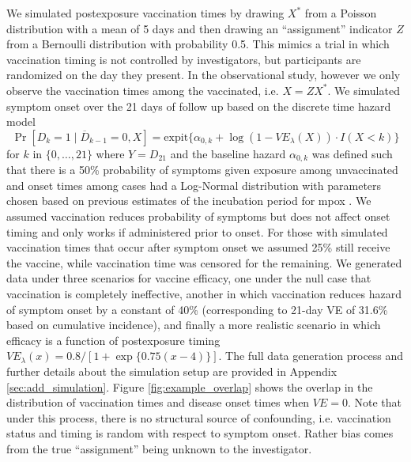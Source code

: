 \documentclass[11pt]{article}
\begin{document}
We simulated postexposure vaccination times by drawing $X^*$ from a Poisson distribution with a mean of 5 days and then drawing an ``assignment'' indicator $Z$ from a Bernoulli distribution with probability 0.5. This mimics a trial in which vaccination timing is not controlled by investigators, but participants are randomized on the day they present. In the observational study, however we only observe the vaccination times among the vaccinated, i.e. $X = ZX^* $. We simulated symptom onset over the 21 days of follow up based on the discrete time hazard model 
$$\Pr[D_k = 1 \mid \overline{D}_{k-1} = 0, X] =  \text{expit}\{\alpha_{0,k} + \log(1 - VE_{\lambda}(X)) \cdot I(X < k)\}$$
for $k$ in $\{0, \ldots, 21\}$ where $Y = D_{21}$ and the baseline hazard $\alpha_{0,k}$ was defined such that there is a 50\% probability of symptoms given exposure among unvaccinated and onset times among cases had a Log-Normal distribution with parameters chosen based on previous estimates of the incubation period for mpox \cite{miura_estimated_2022}. We assumed vaccination reduces probability of symptoms but does not affect onset timing and only works if administered prior to onset. For those with simulated vaccination times that occur after symptom onset we assumed 25\% still receive the vaccine, while vaccination time was censored for the remaining. We generated data under three scenarios for vaccine efficacy, one under the null case that vaccination is completely ineffective, another in which vaccination reduces hazard of symptom onset by a constant of 40\% (corresponding to 21-day VE of 31.6\% based on cumulative incidence), and finally a more realistic scenario in which efficacy is a function of postexposure timing $VE_{\lambda}(x) = 0.8/[1+\exp\{0.75(x-4)\}]$. The full data generation process and further details about the simulation setup are provided in Appendix \ref{sec:add_simulation}. Figure \ref{fig:example_overlap} shows the overlap in the distribution of vaccination times and disease onset times when $VE = 0$.   Note that under this process, there is no structural source of confounding, i.e. vaccination status and timing is random with respect to symptom onset.   Rather bias comes from the true ``assignment'' being unknown to the investigator.
\end{document}
